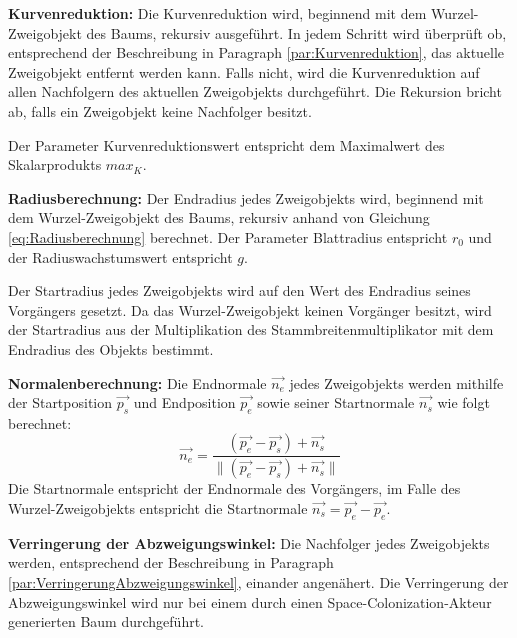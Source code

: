 \begin{description}
	\item \textbf{Kurvenreduktion:} Die Kurvenreduktion wird, beginnend mit dem Wurzel-Zweigobjekt des Baums, rekursiv ausgeführt. In jedem Schritt wird überprüft ob, entsprechend der Beschreibung in Paragraph \ref{par:Kurvenreduktion}, das aktuelle Zweigobjekt entfernt werden kann. Falls nicht, wird die Kurvenreduktion auf allen Nachfolgern des aktuellen Zweigobjekts durchgeführt. Die Rekursion bricht ab, falls ein Zweigobjekt keine Nachfolger besitzt.
	
	Der Parameter \glqq Kurvenreduktionswert\grqq{} entspricht dem Maximalwert des Skalarprodukts $max_K$.\\
	
	\item \textbf{Radiusberechnung:} Der Endradius jedes Zweigobjekts wird, beginnend mit dem Wurzel-Zweigobjekt des Baums, rekursiv anhand von Gleichung \ref{eq:Radiusberechnung} berechnet. Der Parameter \glqq Blattradius\grqq{} entspricht $r_0$ und der \glqq Radiuswachstumswert\grqq{} entspricht $g$. 
	
	Der Startradius jedes Zweigobjekts wird auf den Wert des Endradius seines Vorgängers gesetzt. Da das Wurzel-Zweigobjekt keinen Vorgänger besitzt, wird der Startradius aus der Multiplikation des Stammbreitenmultiplikator mit dem Endradius des Objekts bestimmt.\\
	
	\item \textbf{Normalenberechnung:} Die Endnormale $\overrightarrow{n_{e}}$ jedes Zweigobjekts werden mithilfe der Startposition $\overrightarrow{p_{s}}$ und Endposition $\overrightarrow{p_{e}}$ sowie seiner Startnormale $\overrightarrow{n_{s}}$ wie folgt berechnet:
	\begin{equation}
		\overrightarrow{n_{e}} = \dfrac{(\overrightarrow{p_{e}} - \overrightarrow{p_{s}}) + \overrightarrow{n_{s}}}{\lVert (\overrightarrow{p_{e}} - \overrightarrow{p_{s}}) + \overrightarrow{n_{s}} \rVert}
	\end{equation}
	Die Startnormale entspricht der Endnormale des Vorgängers, im Falle des Wurzel-Zweigobjekts entspricht die Startnormale $\overrightarrow{n_s} = \overrightarrow{p_{e}} - \overrightarrow{p_{e}}$. \\
	
	
	\item \textbf{Verringerung der Abzweigungswinkel:} Die Nachfolger jedes Zweigobjekts werden, entsprechend der Beschreibung in Paragraph \ref{par:VerringerungAbzweigungswinkel}, einander angenähert. Die Verringerung der Abzweigungswinkel wird nur bei einem durch einen Space-Colonization-Akteur generierten Baum durchgeführt.
\end{description}


